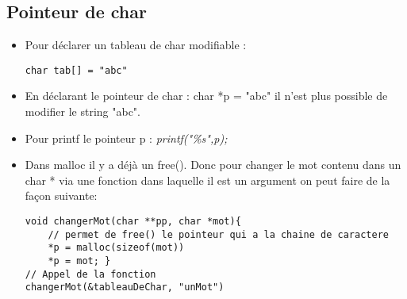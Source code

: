 \documentclass[12pt,a4paper]{article}
\begin{document}
\subsection{Pointeur de char}
\begin{itemize}
\item Pour déclarer un tableau de char modifiable : 
\begin{lstlisting}
char tab[] = "abc"
\end{lstlisting}
\item En déclarant le pointeur de char : char *p = "abc" il n'est plus possible de modifier le string "abc".
\item Pour printf le pointeur p : \textit{printf("\%s",p);}
\item Dans malloc il y a déjà un free(). Donc pour changer le mot contenu dans un char * via une fonction dans laquelle il est un argument on peut faire de la façon suivante:
\begin{lstlisting}
void changerMot(char **pp, char *mot){
	// permet de free() le pointeur qui a la chaine de caractere
	*p = malloc(sizeof(mot)) 
	*p = mot; }	
// Appel de la fonction
changerMot(&tableauDeChar, "unMot")
\end{lstlisting}

\end{itemize}
\end{document}
